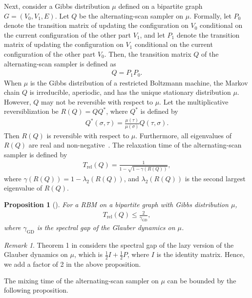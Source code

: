 \documentclass[11pt]{amsart}
\newtheorem{proposition}[theorem]{Proposition}
\theoremstyle{definition}
\theoremstyle{remark}
\newtheorem*{remark}{Remark}
\begin{document}
Next, consider a Gibbs distribution $\mu$ defined on a bipartite graph $G=(V_0,V_1,E)$. Let $Q$ be the alternating-scan sampler on $\mu$. Formally, let $P_0$ denote the transition matrix of updating the configuration on $V_0$ conditional on the current configuration of the other part $V_1$, and let $P_1$ denote the transition matrix of updating the configuration on $V_1$ conditional on the current configuration of the other part $V_0$. Then, the transition matrix $Q$ of the alternating-scan sampler is defined as
\begin{align*}
Q = P_1P_0.
\end{align*}
When $\mu$ is the Gibbs distribution of a restricted Boltzmann machine, the Markov chain $Q$ is irreducible, aperiodic, and has the unique stationary distribution $\mu$. However, $Q$ may not be reversible with respect to $\mu$. Let the multiplicative reversiblization be $R(Q) = QQ^*$, where $Q^*$ is defined by
\begin{align*}
Q^*(\sigma,\tau) = \frac{\mu(\tau)}{\mu(\sigma)} Q(\tau,\sigma).
\end{align*}
Then $R(Q)$ is reversible with respect to $\mu$.
Furthermore, all eigenvalues of $R(Q)$ are real and non-negative~\cite{fill1991eigenvalue}.
The relaxation time of the alternating-scan sampler is defined by
\begin{align*}
T_{\text{rel}}(Q) = \frac{1}{1 - \sqrt{1 - \gamma(R(Q))}},
\end{align*}
where $\gamma(R(Q)) = 1 - \lambda_2(R(Q))$, and $\lambda_2(R(Q))$ is the second largest eigenvalue of $R(Q)$.

\begin{proposition}[]\label{prop:relaxation-time-alternating-scan}
    For a RBM on a bipartite graph with Gibbs distribution $\mu$,
    \begin{align*}
     T_{\text{rel}}(Q) \leq \frac{2}{\gamma_{\text{GD}}},
    \end{align*}
where $\gamma_{\text{GD}}$ is the spectral gap of the Glauber dynamics on $\mu$.
\end{proposition}
\begin{remark}
Theorem 1 in \cite{GuoKZ18} considers the spectral gap of the lazy version of the Glauber dynamics on $\mu$, which is $\frac{1}{2}I + \frac{1}{2}P$, where $I$ is the identity matrix. Hence, we add a factor of 2 in the above proposition.
\end{remark}

The mixing time of the alternating-scan sampler on $\mu$ can be bounded by the following proposition.
\end{document}
